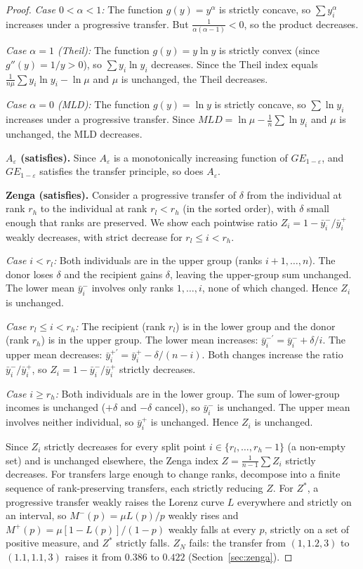 \documentclass[12pt]{article}
\theoremstyle{plain}
\theoremstyle{definition}
\theoremstyle{remark}
\begin{document}
\begin{proof}
\emph{Case $0 < \alpha < 1$:} The function $g(y) = y^\alpha$ is strictly concave, so $\sum y_i^\alpha$ increases under a progressive transfer.
But $\frac{1}{\alpha(\alpha-1)} < 0$, so the product decreases.

\emph{Case $\alpha = 1$ (Theil):} The function $g(y) = y\ln y$ is strictly convex (since $g''(y) = 1/y > 0$), so $\sum y_i \ln y_i$ decreases.
Since the Theil index equals $\frac{1}{n\mu}\sum y_i\ln y_i - \ln\mu$ and $\mu$ is unchanged, the Theil decreases.

\emph{Case $\alpha = 0$ (MLD):} The function $g(y) = \ln y$ is strictly concave, so $\sum \ln y_i$ increases under a progressive transfer.
Since $MLD = \ln\mu - \frac{1}{n}\sum\ln y_i$ and $\mu$ is unchanged, the MLD decreases.

\textbf{$A_\varepsilon$ (satisfies).}
Since $A_\varepsilon$ is a monotonically increasing function of $GE_{1-\varepsilon}$, and $GE_{1-\varepsilon}$ satisfies the transfer principle, so does $A_\varepsilon$.

\textbf{Zenga (satisfies).}
Consider a progressive transfer of $\delta$ from the individual at rank $r_h$ to the individual at rank $r_l < r_h$ (in the sorted order), with $\delta$ small enough that ranks are preserved.
We show each pointwise ratio $Z_i = 1 - \bar{y}^{-}_i/\bar{y}^{+}_i$ weakly decreases, with strict decrease for $r_l \leq i < r_h$.

\emph{Case $i < r_l$:} Both individuals are in the upper group (ranks $i+1, \ldots, n$).
The donor loses $\delta$ and the recipient gains $\delta$, leaving the upper-group sum unchanged.
The lower mean $\bar{y}^{-}_i$ involves only ranks $1, \ldots, i$, none of which changed.
Hence $Z_i$ is unchanged.

\emph{Case $r_l \leq i < r_h$:} The recipient (rank $r_l$) is in the lower group and the donor (rank $r_h$) is in the upper group.
The lower mean increases: $\bar{y}^{-\prime}_i = \bar{y}^{-}_i + \delta/i$.
The upper mean decreases: $\bar{y}^{+\prime}_i = \bar{y}^{+}_i - \delta/(n-i)$.
Both changes increase the ratio $\bar{y}^{-}_i/\bar{y}^{+}_i$, so $Z_i = 1 - \bar{y}^{-}_i/\bar{y}^{+}_i$ strictly decreases.

\emph{Case $i \geq r_h$:} Both individuals are in the lower group.
The sum of lower-group incomes is unchanged ($+\delta$ and $-\delta$ cancel), so $\bar{y}^{-}_i$ is unchanged.
The upper mean involves neither individual, so $\bar{y}^{+}_i$ is unchanged.
Hence $Z_i$ is unchanged.

Since $Z_i$ strictly decreases for every split point $i \in \{r_l, \ldots, r_h - 1\}$ (a non-empty set) and is unchanged elsewhere, the Zenga index $Z = \frac{1}{n-1}\sum Z_i$ strictly decreases.
For transfers large enough to change ranks, decompose into a finite sequence of rank-preserving transfers, each strictly reducing $Z$.
For $Z^*$, a progressive transfer weakly raises the Lorenz curve $L$ everywhere and strictly on an interval, so $M^{-}(p) = \mu L(p)/p$ weakly rises and $M^{+}(p) = \mu[1 - L(p)]/(1 - p)$ weakly falls at every $p$, strictly on a set of positive measure, and $Z^*$ strictly falls.
$Z_N$ fails: the transfer from $(1, 1.2, 3)$ to $(1.1, 1.1, 3)$ raises it from $0.386$ to $0.422$ (Section~\ref{sec:zenga}).


\end{proof}
\end{document}
